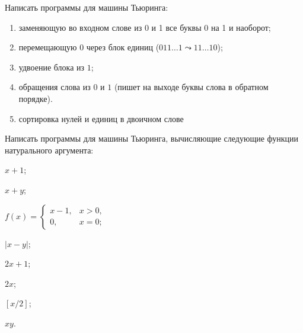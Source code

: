 \documentclass[a4paper, 12pt, num=ТА1]{listok}
\begin{document}
\begin{problem}
	Написать программы для машины Тьюринга:
	\begin{enumerate}
		\item заменяющую во входном слове из 0 и 1 все буквы 0 на 1 и наоборот;
		\item перемещающую 0 через блок единиц ($011\ldots 1 \leadsto 11\ldots 10$);
		\item удвоение блока из $1$;
		\item обращения слова из $0$ и $1$ (пишет на выходе буквы слова в обратном порядке).
		\item сортировка нулей и единиц в двоичном слове
	\end{enumerate}
\end{problem}
\begin{problem}
	Написать программы для машины Тьюринга, вычисляющие следующие функции натурального аргумента:
	\begin{multienum}{2}
		\item $x + 1$;
		\item $x + y$;
		\item $
			f(x) = \left \{
				\begin{aligned}
					x - 1, & x > 0,\\
					0, & x = 0;
				\end{aligned}
				\right .
		$
		\item $|x -y|$;
		\item $2x + 1$;
		\item $2x$;
		\item $[x/2]$;
		\item $xy$.
	\end{multienum}
\end{problem}
\end{document}
